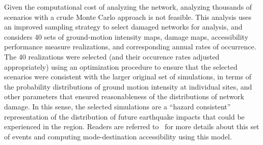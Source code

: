 Given the computational cost of analyzing the network, analyzing thousands of scenarios with a crude Monte Carlo approach is not feasible. This analysis uses an improved sampling strategy to select damaged networks for analysis, and considers 40 sets of ground-motion intensity maps, damage maps, accessibility performance measure realizations, and corresponding annual rates of occurrence. The 40 realizations were selected (and their occurence rates adjusted appropriately) using an optimization procedure to ensure that the selected scenarios were consistent with the larger original set of simulations, in terms of the probability distributions of ground motion intensity at individual sites, and other parameters that ensured reasonableness of the distributions of network damage. In this sense, the selected simulations are a ``hazard consistent'' representation of the distribution of future earthquake impacts that could be experienced in the region. Readers are referred to~\cite{miller_seismic_2014} for more details about this set of events and computing mode-destination accessibility using this model. 


